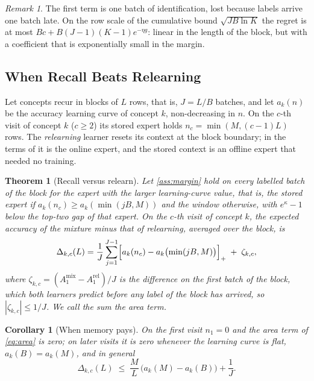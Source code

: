 \documentclass[11pt]{article}
\theoremstyle{plain}
\newtheorem{theorem}{Theorem}
\newtheorem{corollary}{Corollary}
\theoremstyle{definition}
\theoremstyle{remark}
\newtheorem{remark}{Remark}
\begin{document}
\begin{remark}
The first term is one batch of identification, lost because labels arrive one batch late. On the row scale of the
cumulative bound $\sqrt{JB\ln K}$ the regret is at most $Bc+B(J-1)(K-1)e^{-\eta g}$: linear in the length of the
block, but with a coefficient that is exponentially small in the margin.
\end{remark}

\subsection{When Recall Beats Relearning}
\label{sec:th-recall}

Let concepts recur in blocks of $L$ rows, that is, $J=L/B$ batches, and let $a_k(n)$ be the accuracy learning curve
of concept $k$, non-decreasing in $n$. On the $c$-th visit of concept $k$ ($c\ge2$) its stored expert holds
$n_c=\min(M,(c-1)L)$ rows. The \emph{relearning} learner resets its context at the block boundary; in the terms of
\citet{zhao2025mooe} it is the online expert, and the stored context is an offline expert that needed no training.

\begin{theorem}[Recall versus relearn]\label{prop:recall}
Let \cref{ass:margin} hold on every labelled batch of the block for the expert with the larger learning-curve
value, that is, the stored expert if $a_k(n_c)\ge a_k(\min(jB,M))$ and the window otherwise, with $e^\kappa-1$ below
the top-two gap of that expert. On the $c$-th visit of concept $k$, the expected accuracy of
the mixture minus that of relearning, averaged over the block, is
\begin{equation}\label{eq:area}
  \Delta_{k,c}(L)=\frac1J\sum_{j=1}^{J-1}\Bigl[a_k(n_c)-a_k\bigl(\min(jB,M)\bigr)\Bigr]_+ \;+\;\zeta_{k,c},
\end{equation}
where $\zeta_{k,c}=(A^{\mathrm{mix}}_{1}-A^{\mathrm{rel}}_{1})/J$ is the difference on the first batch of the
block, which both learners predict before any label of the block has arrived, so $|\zeta_{k,c}|\le1/J$. We call
the sum the \emph{area term}.
\end{theorem}

\begin{corollary}[When memory pays]\label{cor:flat}
On the first visit $n_1=0$ and the area term of \eqref{eq:area} is zero; on later visits it is zero whenever the
learning curve is flat, $a_k(B)=a_k(M)$, and in general
\[
  \Delta_{k,c}(L)\;\le\;\frac{M}{L}\,\bigl(a_k(M)-a_k(B)\bigr)+\frac1J .
\]
\end{corollary}
\end{document}
